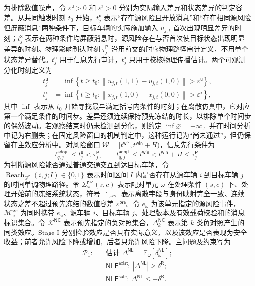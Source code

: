 \documentclass[10pt,a4paper,twocolumn]{article}
\begin{document}
为排除数值噪声，令 $\varepsilon^{\mathsf u}>0$ 和 $\varepsilon^{\mathsf x}>0$ 分别为实际输入差异和状态差异的判定容差。从共同触发时刻 $t_0$ 开始，$t_j^{\mathsf u}$ 表示“存在源风险且开放消息”和“存在相同源风险但屏蔽消息”两种条件下，目标车辆的实际施加输入 $u_{j,t}$ 首次出现明显差异的时刻；$t_j^{\mathsf x}$ 表示在两种条件均屏蔽消息时，源风险存在与否首次使目标状态出现明显差异的时刻。物理影响到达时刻 $\tau_j^{\mathsf P}$ 沿用前文的时序物理路径审计定义，不用单个状态差异替代。$t_j^{\mathsf u}$ 用于信息先行审计，$t_j^{\mathsf x}$ 只用于校核物理传播估计。两个可观测分化时刻定义为
\begin{equation}
\begin{aligned}
t_j^{\mathsf u}&=\inf\left\{t\geq t_0:\left\|u_{j,t}(1,1)-u_{j,t}(1,0)\right\|>\varepsilon^{\mathsf u}\right\},\\
t_j^{\mathsf x}&=\inf\left\{t\geq t_0:\left\|x_{j,t}(1,0)-x_{j,t}(0,0)\right\|>\varepsilon^{\mathsf x}\right\},
\end{aligned}
\end{equation}
其中 $\inf$ 表示从 $t_0$ 开始寻找最早满足括号内条件的时刻；在离散仿真中，它对应第一个满足条件的时间步。差异还须连续保持预先冻结的时长，以排除单个时间步的偶然波动。若观察结束时仍未检测到分化，则约定 $\inf\varnothing=+\infty$，并在时间分析中记为右删失；在固定风险窗口的机制判定中，这种运行记为“尚未通过”，但仍保留在主效应分析中。对风险窗口 $\mathcal W=[t^{\mathsf{win}},t^{\mathsf{win}}+H)$，信息先行条件为
\begin{equation}
t_{q,j}^{\mathsf{adopt}}\leq t_j^{\mathsf u}<\tau_j^{\mathsf P},\qquad
t_{q,j}^{\mathsf{adopt}}\leq t^{\mathsf{win}}<t^{\mathsf{win}}+H\leq\tau_j^{\mathsf P}.
\end{equation}
为判断源风险能否通过普通交通交互到达目标车辆，令 $\operatorname{Reach}_{G^{\mathsf P}}(i,j;I)\in\{0,1\}$ 表示时间区间 $I$ 内是否存在从源车辆 $i$ 到目标车辆 $j$ 的时间单调物理路径。令 $\Sigma_{\omega}^{\mathsf{pre}}(s,c)$ 表示配对单元 $\omega$ 在处理条件 $(s,c)$ 下、处理开始前的冻结系统状态，符号 $\doteq_{\varepsilon^{\mathsf{pre}}}$ 表示离散字段与身份映射完全一致、连续状态之差不超过预先冻结的数值容差 $\varepsilon^{\mathsf{pre}}$。令 $e_\omega$ 为该单元指定的源风险事件，$\mathcal M_{\omega}^{\mathsf{src}}$ 为同时携带 $e_\omega$、源车辆 $i$、目标车辆 $j$、处理版本及有效载荷校验和的消息标识集合。令 $\mathcal K^{\mathsf{NC}}$ 表示预先指定的负对照集合，$\Delta_{k}^{\mathsf{NC}}$ 表示第 $k$ 类负对照产生的同类效应。Stage I 分别检验效应是否具有实际意义，以及该效应是否表现为安全收益；前者允许风险下降或增加，后者只允许风险下降。主问题及约束写为
\begin{equation}\label{eq:P1}
\begin{aligned}
\mathcal P_1:\quad
&\text{估计 }\Delta^{\mathsf{NL}}=\mathbb E_\omega[\delta_\omega^{\mathsf{NL}}];\\
&\mathsf{NLE}^{\mathsf{exist}}:\ |\Delta^{\mathsf{NL}}|\geq\delta^{\mathsf R};\\
&\mathsf{NLE}^{\mathsf{safe}}:\ \Delta^{\mathsf{NL}}\leq-\delta^{\mathsf R}.
\end{aligned}
\end{equation}
\end{document}
